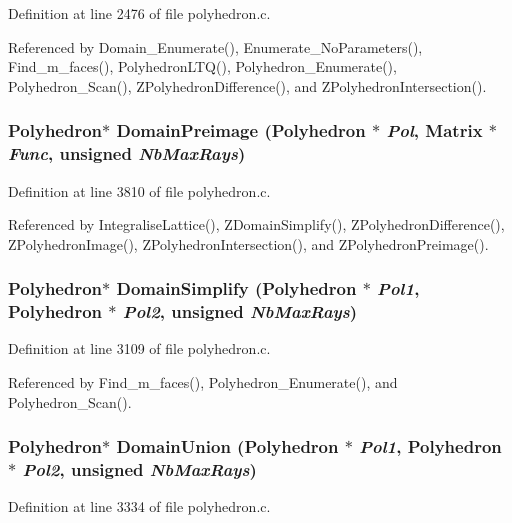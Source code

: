 Definition at line 2476 of file polyhedron.c.

Referenced by Domain\_\-Enumerate(), Enumerate\_\-No\-Parameters(), Find\_\-m\_\-faces(), Polyhedron\-LTQ(), Polyhedron\_\-Enumerate(), Polyhedron\_\-Scan(), ZPolyhedron\-Difference(), and ZPolyhedron\-Intersection().

\subsubsection{\setlength{\rightskip}{0pt plus 5cm}Polyhedron$\ast$ Domain\-Preimage (Polyhedron $\ast$ {\em Pol}, Matrix $\ast$ {\em Func}, unsigned {\em Nb\-Max\-Rays})}\label{polyhedron_8c_a51}




Definition at line 3810 of file polyhedron.c.

Referenced by Integralise\-Lattice(), ZDomain\-Simplify(), ZPolyhedron\-Difference(), ZPolyhedron\-Image(), ZPolyhedron\-Intersection(), and ZPolyhedron\-Preimage().

\subsubsection{\setlength{\rightskip}{0pt plus 5cm}Polyhedron$\ast$ Domain\-Simplify (Polyhedron $\ast$ {\em Pol1}, Polyhedron $\ast$ {\em Pol2}, unsigned {\em Nb\-Max\-Rays})}\label{polyhedron_8c_a42}




Definition at line 3109 of file polyhedron.c.

Referenced by Find\_\-m\_\-faces(), Polyhedron\_\-Enumerate(), and Polyhedron\_\-Scan().

\subsubsection{\setlength{\rightskip}{0pt plus 5cm}Polyhedron$\ast$ Domain\-Union (Polyhedron $\ast$ {\em Pol1}, Polyhedron $\ast$ {\em Pol2}, unsigned {\em Nb\-Max\-Rays})}\label{polyhedron_8c_a44}




Definition at line 3334 of file polyhedron.c.


